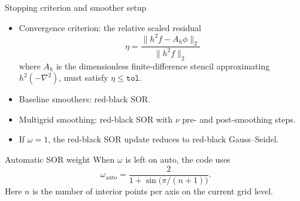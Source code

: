 \documentclass[aspectratio=169]{beamer}
\newcommand{\frametitlesub}[2]{#2}
\begin{document}
\begin{frame}[t]{\frametitlesub{Algorithms and backends}{Stopping criterion and smoother setup}}
    \footnotesize
    \begin{itemize}
        \item Convergence criterion: the relative scaled residual
              \[
                  \eta = \frac{\|h^2 f - A_h\phi\|_2}{\|h^2 f\|_2}
              \]
              where \(A_h\) is the dimensionless finite-difference stencil approximating \(h^2(-\nabla^2)\),
              must satisfy \(\eta \le \texttt{tol}\).
        \item Baseline smoothers: red-black SOR.
        \item Multigrid smoothing: red-black SOR with \(\nu\) pre- and post-smoothing steps.
        \item If \(\omega = 1\), the red-black SOR update reduces to red-black Gauss--Seidel.
    \end{itemize}

    \begin{block}{Automatic SOR weight}
        When \(\omega\) is left on auto, the code uses
        \[
            \omega_{\mathrm{auto}} = \frac{2}{1 + \sin\!\bigl(\pi/(n+1)\bigr)}.
        \]
        Here \(n\) is the number of interior points per axis on the current grid level.
    \end{block}
\end{frame}
\endgroup
\end{document}
